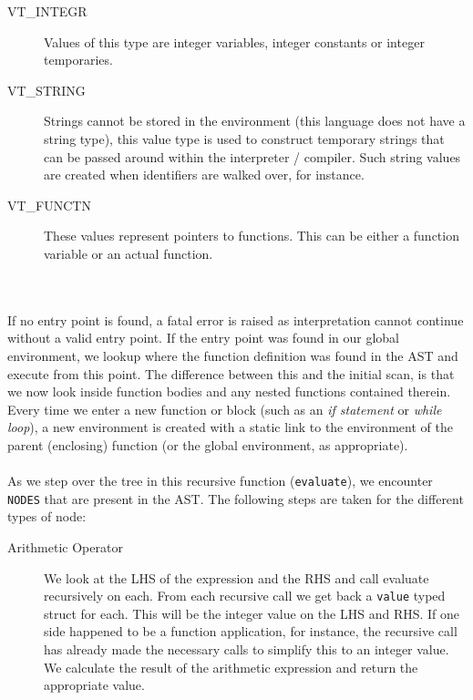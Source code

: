 \begin{description}
	\item[VT\_INTEGR] Values of this type are integer variables, integer constants or integer temporaries.
	\item[VT\_STRING] Strings cannot be stored in the environment (this language does not have a string type), this value type is used to construct temporary strings that can be passed around within the interpreter / compiler. Such string values are created when identifiers are walked over, for instance.
	\item[VT\_FUNCTN] These values represent pointers to functions. This can be either a function variable or an actual function.
\end{description}

\ \\ \ \\
If no entry point is found, a fatal error is raised as interpretation cannot continue without a valid entry point. If the entry point was found in our global environment, we lookup where the function definition was found in the AST and execute from this point. The difference between this and the initial scan, is that we now look inside function bodies and any nested functions contained therein. Every time we enter a new function or block (such as an \emph{if statement} or \emph{while loop}), a new environment is created with a static link to the environment of the parent (enclosing) function (or the global environment, as appropriate).
\ \\ \ \\
As we step over the tree in this recursive function (\verb!evaluate!), we encounter \verb!NODES! that are present in the AST. The following steps are taken for the different types of node:

\begin{description}
	\item[Arithmetic Operator] We look at the LHS of the expression and the RHS and call evaluate recursively on each. From each recursive call we get back a \verb!value! typed struct for each. This will be the integer value on the LHS and RHS. If one side happened to be a function application, for instance, the recursive call has already made the necessary calls to simplify this to an integer value. We calculate the result of the arithmetic expression and return the appropriate value.
	
\end{description}


